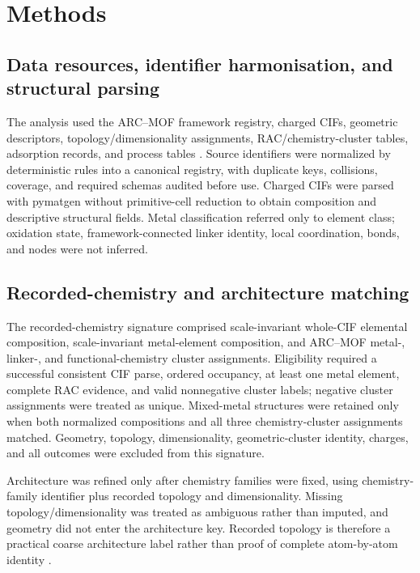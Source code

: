 \documentclass[11pt,a4paper]{article}
\begin{document}
\section{Methods}

\subsection{Data resources, identifier harmonisation, and structural parsing}

The analysis used the ARC--MOF framework registry, charged CIFs, geometric
descriptors, topology/dimensionality assignments, RAC/chemistry-cluster tables,
adsorption records, and process tables
\cite{burner2023arcmof,willems2012zeopp,janet2017rac}. Source identifiers were
normalized by deterministic rules into a canonical registry, with duplicate keys,
collisions, coverage, and required schemas audited before use. Charged CIFs were
parsed with pymatgen \cite{ong2013pymatgen} without primitive-cell reduction to
obtain composition and descriptive structural fields. Metal classification referred
only to element class; oxidation state, framework-connected linker identity, local
coordination, bonds, and nodes were not inferred.

\subsection{Recorded-chemistry and architecture matching}

The recorded-chemistry signature comprised scale-invariant whole-CIF elemental
composition, scale-invariant metal-element composition, and ARC--MOF metal-,
linker-, and functional-chemistry cluster assignments. Eligibility required a
successful consistent CIF parse, ordered occupancy, at least one metal element,
complete RAC evidence, and valid nonnegative cluster labels; negative cluster
assignments were treated as unique. Mixed-metal structures were retained only when
both normalized compositions and all three chemistry-cluster assignments matched.
Geometry, topology, dimensionality, geometric-cluster identity, charges, and all
outcomes were excluded from this signature.

Architecture was refined only after chemistry families were fixed, using
chemistry-family identifier plus recorded topology and dimensionality. Missing
topology/dimensionality was treated as ambiguous rather than imputed, and geometry
did not enter the architecture key. Recorded topology is therefore a practical
coarse architecture label rather than proof of complete atom-by-atom identity
\cite{zoubritzky2022crystalnets}.
\end{document}
